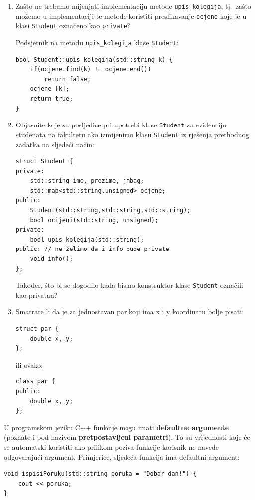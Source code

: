 \begin{razmisljanje}
    \begin{enumerate}
        \item 
        Zašto ne trebamo mijenjati implementaciju metode \texttt{upis\_kolegija},
        tj.\ zašto možemo u implementaciji te metode
        koristiti preslikavanje \texttt{ocjene}
        koje je u klasi \texttt{Student}
        označeno kao \texttt{private}?

        Podsjetnik na metodu \texttt{upis\_kolegija} klase \texttt{Student}:
    \begin{verbatim}
bool Student::upis_kolegija(std::string k) {
    if(ocjene.find(k) != ocjene.end())
        return false;
    ocjene [k];
    return true; 
}
    \end{verbatim}

    \item 
    Objasnite koje su posljedice pri upotrebi klase \texttt{Student} za evidenciju
    studenata na fakultetu ako izmijenimo klasu \texttt{Student}
    iz rješenja prethodnog zadatka na sljedeći način:
\begin{verbatim}
struct Student {
private:
    std::string ime, prezime, jmbag;
    std::map<std::string,unsigned> ocjene;
public:
    Student(std::string,std::string,std::string);
    bool ocijeni(std::string, unsigned);
private:
    bool upis_kolegija(std::string);
public: // ne želimo da i info bude private
    void info();
};
\end{verbatim}
    Također, što bi se dogodilo kada bismo konstruktor klase \texttt{Student}
    označili kao privatan?

    \item 
    Smatrate li da je za jednostavan par koji ima x i y koordinatu
bolje pisati:
\begin{verbatim}
struct par {
    double x, y;
};
\end{verbatim}
ili ovako:
\begin{verbatim}
class par {
public:
    double x, y;
};
\end{verbatim}
    \end{enumerate}
\end{razmisljanje}


U programskom jeziku C++ funkcije mogu imati 
\textbf{defaultne argumente} (poznate i pod nazivom 
\textbf{pretpostavljeni parametri}). 
To su vrijednosti koje će se automatski koristiti ako prilikom poziva funkcije korisnik ne navede odgovarajući argument.
Primjerice, sljedeća funkcija ima defaultni argument:
\begin{verbatim}
void ispisiPoruku(std::string poruka = "Dobar dan!") {
    cout << poruka;
}
\end{verbatim}


